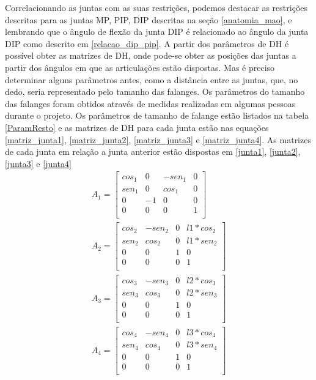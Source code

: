Correlacionando as juntas com as suas restrições, podemos destacar as restrições descritas para as juntas MP, PIP, DIP descritas na seção \ref{anatomia_mao}, e lembrando que o ângulo de flexão da junta DIP é relacionado ao ângulo da junta DIP como descrito em \ref{relacao_dip_pip}.
A partir dos parâmetros de DH é possível obter as matrizes de DH, onde pode-se obter as posições das juntas a partir dos ângulos em que as articulações estão dispostas. Mas é preciso determinar alguns parâmetros antes, como a distância entre as juntas, que, no dedo, seria representado pelo tamanho das falanges. Os parâmetros do tamanho das falanges foram obtidos através de medidas realizadas em algumas pessoas durante o projeto. Os parâmetros de tamanho de falange estão listados na tabela \ref{ParamResto} e as matrizes de DH para cada junta estão nas equações \ref{matriz_junta1}, \ref{matriz_junta2}, \ref{matriz_junta3} e \ref{matriz_junta4}.
As matrizes de cada junta em relação a junta anterior estão dispostas em \ref{junta1}, \ref{junta2}, \ref{junta3} e \ref{junta4} 
\begin{align}
A_1=
\begin{bmatrix}
cos_1 & 0 & -sen_1 & 0\\
sen_1 & 0 & cos_1 & 0\\
0 & -1 & 0 & 0\\
0 & 0 & 0 & 1\\
\end{bmatrix} \label{junta1}\\
A_2=
\begin{bmatrix}
cos_2 & -sen_2 & 0 & l1*cos_2\\
sen_2 & cos_2 & 0 & l1*sen_2\\
0 & 0 & 1 & 0\\
0 & 0 & 0 & 1\\
\end{bmatrix}  \label{junta2} \\
A_3=
\begin{bmatrix}
cos_3 & -sen_3 & 0 & l2*cos_3\\
sen_3 & cos_3 & 0 & l2*sen_3\\
0 & 0 & 1 & 0\\
0 & 0 & 0 & 1\\
\end{bmatrix}  \label{junta3} \\
A_4=
\begin{bmatrix}
cos_4 & -sen_4 & 0 & l3*cos_4\\
sen_4 & cos_4 & 0 & l3*sen_4\\
0 & 0 & 1 & 0\\
0 & 0 & 0 & 1\\
\end{bmatrix} \label{junta4}
\end{align}

